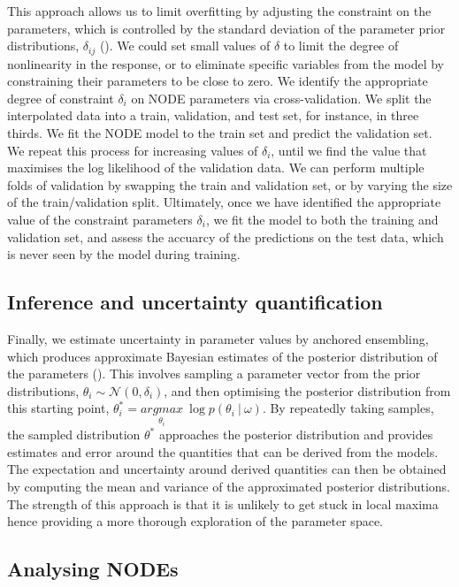 \documentclass[11pt, oneside]{article}
\begin{document}
This approach allows us to limit overfitting by adjusting the constraint on the parameters, which is controlled by the standard deviation of the parameter prior distributions, $\delta_{ij}$ (\cite{Cawley2007, Bonnaffe2021a}).
We could set small values of $\delta$ to limit the degree of nonlinearity in the response, or to eliminate specific variables from the model by constraining their parameters to be close to zero.
We identify the appropriate degree of constraint $\delta_{i}$ on NODE parameters via cross-validation. 
We split the interpolated data into a train, validation, and test set, for instance, in three thirds.
We fit the NODE model to the train set and predict the validation set.
We repeat this process for increasing values of $\delta_{i}$, until we find the value that maximises the log likelihood of the validation data.
We can perform multiple folds of validation by swapping the train and validation set, or by varying the size of the train/validation split.
Ultimately, once we have identified the appropriate value of the constraint parameters $\delta_{i}$, we fit the model to both the training and validation set, and assess the accuarcy of the predictions on the test data, which is never seen by the model during training.

\subsection{Inference and uncertainty quantification}

Finally, we estimate uncertainty in parameter values by anchored ensembling, which produces approximate Bayesian estimates of the posterior distribution of the parameters (\cite{Pearce2018}).
This involves sampling a parameter vector from the prior distributions, $\theta_{i} \sim \mathcal{N}(0,\delta_{i})$, and then optimising the posterior distribution from this starting point, $\theta^*_i = \underset{\theta_i}{argmax}~\log p(\theta_i~|~\omega)$.
By repeatedly taking samples, the sampled distribution $\theta^*$ approaches the posterior distribution and provides estimates and error around the quantities that can be derived from the models.
The expectation and uncertainty around derived quantities can then be obtained by computing the mean and variance of the approximated posterior distributions.
The strength of this approach is that it is unlikely to get stuck in local maxima hence providing a more thorough exploration of the parameter space.

\subsection{Analysing NODEs}
\end{document}
